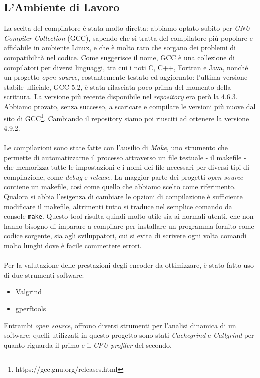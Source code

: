 \subsection{L'Ambiente di Lavoro}
La scelta del compilatore è stata molto diretta: abbiamo 
optato subito per 
\emph{GNU Compiler Collection} (GCC), sapendo che si tratta del compilatore più 
popolare e affidabile in ambiente Linux, e che è molto raro che sorgano dei 
problemi di compatibilità nel codice. Come suggerisce il nome, GCC è una 
collezione di compilatori per diversi linguaggi, tra cui i noti C, C++, Fortran 
e Java, nonché un progetto \emph{open source}, costantemente testato ed 
aggiornato: 
l'ultima versione stabile ufficiale, GCC 5.2, è stata rilasciata poco prima 
del momento della scrittura. La versione più recente disponibile nel 
\emph{repository} era però la 4.6.3. Abbiamo provato, senza successo, a 
scaricare e compilare le versioni più nuove dal sito di 
GCC\footnote{https://gcc.gnu.org/releases.html}. Cambiando il repository siamo 
poi riusciti ad ottenere la versione 4.9.2.
\\ \\
Le compilazioni sono state fatte con l'ausilio di \emph{Make}, 
uno strumento 
che permette di automatizzarne il processo attraverso un file 
testuale - il makefile - che memorizza tutte le impostazioni e i nomi dei file 
necessari per diversi tipi di compilazione, come \emph{debug} e \emph{release}. 
La maggior 
parte dei progetti \emph{open source} contiene un makefile, così come quello 
che 
abbiamo scelto come riferimento. Qualora si abbia l'esigenza di cambiare le 
opzioni di 
compilazione è sufficiente modificare il makefile, altrimenti tutto si traduce 
nel semplice comando da console \verb|make|. Questo tool risulta quindi molto 
utile sia ai normali utenti, che non hanno bisogno di imparare a compilare per 
installare un 
programma fornito come codice sorgente, sia agli sviluppatori, cui 
si evita di scrivere ogni volta 
comandi molto lunghi dove è facile commettere errori.
\\ \\
Per la valutazione delle prestazioni degli encoder da ottimizzare, è stato 
fatto uso di due strumenti software:
\begin{itemize}
	\item Valgrind
	\item gperftools
\end{itemize}
Entrambi \emph{open source}, offrono diversi strumenti per l'analisi dinamica 
di un software; quelli utilizzati in questo progetto sono stati
\emph{Cachegrind} e \emph{Callgrind} per quanto riguarda il primo e il 
\emph{CPU profiler} del secondo.
